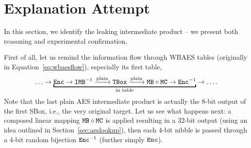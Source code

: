 \section{Explanation Attempt}
\label{sec:attempt}

In this section, we identify the leaking intermediate product -- we present both reasoning and experimental confirmation.

First of all, let us remind the information flow through WBAES tables (originally in Equation~\ref{eq:wbaesflow}), especially its first table,
\begin{equation*}
	\ldots \rarr \underbracket{\Enc \rarr \IMB^{-1} \xrightarrow{\textnormal{plain}} \TBox \xrightarrow{\textnormal{plain}} \MB \circ \MC \rarr \Enc^{-1}}_{\textnormal{in table}} \rarr \ldots .
\end{equation*}
Note that the last plain AES intermediate product is actually the $8$-bit output of the first SBox, i.e., the very original target. Let us see what happens next: a composed linear mapping $\texttt{MB}\circ\texttt{MC}$ is applied resulting in a $32$-bit output (using an idea outlined in Section~\ref{sec:aeslookup}), then each $4$-bit nibble is passed through a $4$-bit random bijection $\texttt{Enc}^{-1}$ (further simply $\texttt{Enc}$).

